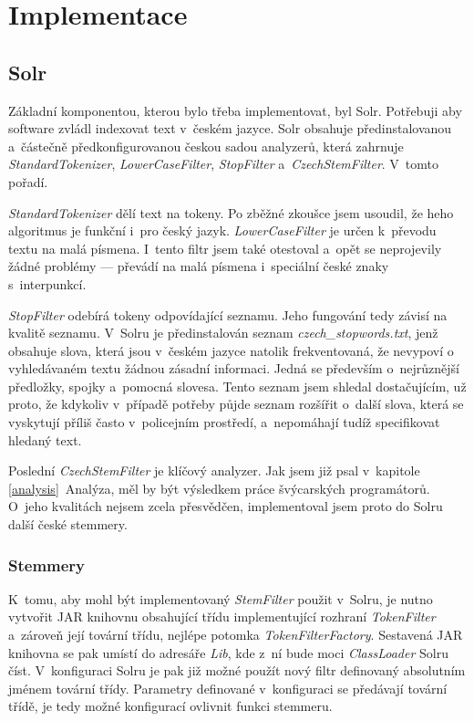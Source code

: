\chapter{Implementace}
\section{Solr}
Základní komponentou, kterou bylo třeba implementovat, byl Solr. Potřebuji aby software zvládl indexovat text v~českém jazyce. Solr obsahuje předinstalovanou a~částečně předkonfigurovanou českou sadou analyzerů, která zahrnuje \emph{StandardTokenizer}, \emph{LowerCaseFilter}, \emph{StopFilter} a~\emph{CzechStemFilter}. V~tomto pořadí.

\emph{StandardTokenizer} dělí text na tokeny. Po zběžné zkoušce jsem usoudil, že heho algoritmus je funkční i~pro český jazyk. \emph{LowerCaseFilter} je určen k~převodu textu na malá písmena. I~tento filtr jsem také otestoval a~opět se neprojevily žádné problémy --- převádí na malá písmena i~speciální české znaky s~interpunkcí. 

\emph{StopFilter} odebírá tokeny odpovídající seznamu. Jeho fungování tedy závisí na kvalitě seznamu. V~Solru je předinstalován seznam \emph{czech\_stopwords.txt}, jenž obsahuje slova, která jsou v~českém jazyce natolik frekventovaná, že nevypoví o vyhledávaném textu žádnou zásadní informaci. Jedná se především o~nejrůznější předložky, spojky a~pomocná slovesa. Tento seznam jsem shledal dostačujícím, už proto, že kdykoliv v~případě potřeby půjde seznam rozšířit o~další slova, která se vyskytují příliš často v~policejním prostředí, a~nepomáhají tudíž specifikovat hledaný text.

Poslední \emph{CzechStemFilter} je klíčový analyzer. Jak jsem již psal v~kapitole \ref{analysis}~Analýza, měl by být výsledkem práce švýcarských programátorů. O~jeho kvalitách nejsem zcela přesvědčen, implementoval jsem proto do Solru další české stemmery.

\subsection{Stemmery}
K~tomu, aby mohl být implementovaný \emph{StemFilter} použit v~Solru, je nutno vytvořit JAR knihovnu obsahující třídu implementující rozhraní \emph{TokenFilter} a~zároveň její tovární třídu, nejlépe potomka \emph{TokenFilterFactory}. Sestavená JAR knihovna se pak umístí do adresáře \emph{Lib}, kde z~ní bude moci \emph{ClassLoader} Solru číst. V~konfiguraci Solru je pak již možné použít nový filtr definovaný absolutním jménem tovární třídy. Parametry definované v~konfiguraci se předávají tovární třídě, je tedy možné konfigurací ovlivnit funkci stemmeru.

